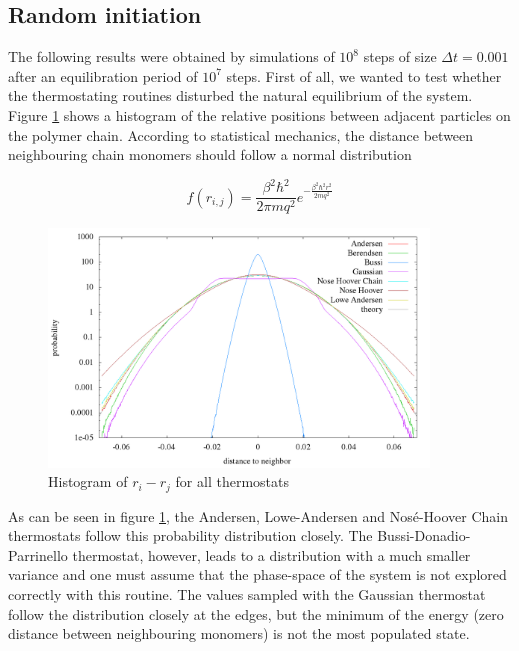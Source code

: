 % 
\graphicspath{{../graphics/}}


\subsection{Random initiation}
The following results were obtained by simulations of $10^8$ steps of size $\Delta t = 0.001$ after an equilibration period of $10^7$ steps. 
First of all, we wanted to test whether the thermostating routines disturbed the natural equilibrium of the system. Figure \ref{im:relPos_rand} shows a histogram of the relative positions between adjacent particles on the polymer chain. According to statistical mechanics, the distance between neighbouring chain monomers should follow a normal distribution 

\begin{equation}
f(r_{i,j}) = \frac{\beta^2\hbar^2}{2\pi mq^2}e^{-\frac{\beta^2\hbar^2r^2}{2mq^2}}
\end{equation}  

\begin{figure}[H]
\centering
\includegraphics[width=0.9\textwidth]{./graphics/Histogramm_relPos_rand_T=20_p=64.png}
\caption{Histogram of $r_i - r_j$ for all thermostats}
\label{im:relPos_rand}
\end{figure} 

As can be seen in figure \ref{im:relPos_rand}, the Andersen, Lowe-Andersen and Nosé-Hoover Chain thermostats follow this probability distribution closely. The Bussi-Donadio-Parrinello thermostat, however, leads to a distribution with a much smaller variance and one must assume that the phase-space of the system is not explored correctly with this routine. The values sampled with the Gaussian thermostat follow the distribution closely at the edges, but the minimum of the energy (zero distance between neighbouring monomers) is not the most populated state.  

